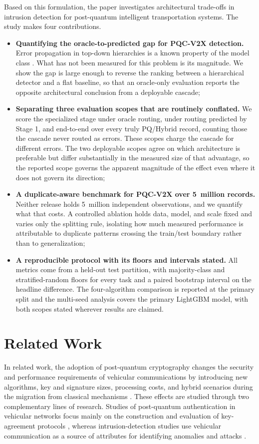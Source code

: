 \documentclass{IEEEoj}
\begin{document}
Based on this formulation, the paper investigates architectural trade-offs in intrusion detection for post-quantum intelligent transportation systems. The study makes four contributions.
\begin{itemize}
    \item \textbf{Quantifying the oracle-to-predicted gap for PQC-V2X detection.} Error propagation in top-down hierarchies is a known property of the model class \cite{silla2011hierarchical}. What has not been measured for this problem is its magnitude. We show the gap is large enough to reverse the ranking between a hierarchical detector and a flat baseline, so that an oracle-only evaluation reports the opposite architectural conclusion from a deployable cascade;
    \item \textbf{Separating three evaluation scopes that are routinely conflated.} We score the specialized stage under oracle routing, under routing predicted by Stage 1, and end-to-end over every truly PQ/Hybrid record, counting those the cascade never routed as errors. These scopes charge the cascade for different errors. The two deployable scopes agree on which architecture is preferable but differ substantially in the measured size of that advantage, so the reported scope governs the apparent magnitude of the effect even where it does not govern its direction;
    \item \textbf{A duplicate-aware benchmark for PQC-V2X over 5~million records.} Neither release holds 5~million independent observations, and we quantify what that costs. A controlled ablation holds data, model, and scale fixed and varies only the splitting rule, isolating how much measured performance is attributable to duplicate patterns crossing the train/test boundary rather than to generalization;
    \item \textbf{A reproducible protocol with its floors and intervals stated.} All metrics come from a held-out test partition, with majority-class and stratified-random floors for every task and a paired bootstrap interval on the headline difference. The four-algorithm comparison is reported at the primary split and the multi-seed analysis covers the primary LightGBM model, with both scopes stated wherever results are claimed.
\end{itemize}

\section{Related Work}
In related work, the adoption of post-quantum cryptography changes the
security and performance requirements of vehicular communications by
introducing new algorithms, key and signature sizes, processing costs, and
hybrid scenarios during the migration from classical mechanisms
\cite{11308316,105035861447,11170005,10838531}. These effects are studied
through two complementary lines of research. Studies of post-quantum
authentication in vehicular networks focus mainly on the construction and
evaluation of key-agreement protocols
\cite{105042709447,105032468742,105020985352}, whereas intrusion-detection
studies use vehicular communication as a source of attributes for identifying
anomalies and attacks \cite{105006773029,85203703051,85061081071}.
\end{document}
